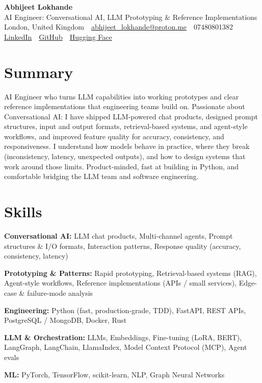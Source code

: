 \documentclass[10pt,a4paper]{article}
\newcommand{\sep}{\,\textcolor{accent!60}{\textbar}\,}
\begin{document}
\begin{center}
  {\fontsize{24}{26}\selectfont\bfseries Abhijeet Lokhande}\\[3pt]
  {\color{accent}\large AI Engineer: Conversational AI, LLM Prototyping \& Reference Implementations}\\[5pt]
  {\small
    London, United Kingdom \sep
    \href{mailto:abhijeet_lokhande@proton.me}{abhijeet\_lokhande@proton.me} \sep
    07480801382 \\[2pt]
    \href{https://www.linkedin.com/in/ablds/}{LinkedIn} \sep
    \href{https://github.com/abhijeetscode}{GitHub} \sep
    \href{https://huggingface.co/ab-ai}{Hugging Face}
  }
\end{center}
\vspace{2pt}

\section{Summary}
AI Engineer who turns LLM capabilities into working prototypes and clear reference implementations that engineering teams build on. Passionate about Conversational AI: I have shipped LLM-powered chat products, designed prompt structures, input and output formats, retrieval-based systems, and agent-style workflows, and improved feature quality for accuracy, consistency, and responsiveness. I understand how models behave in practice, where they break (inconsistency, latency, unexpected outputs), and how to design systems that work around those limits. Product-minded, fast at building in Python, and comfortable bridging the LLM team and software engineering.

\section{Skills}
\begin{tight}
  \item[\textcolor{accent}{\small$\bullet$}] \textbf{Conversational AI:} LLM chat products, Multi-channel agents, Prompt structures \& I/O formats, Interaction patterns, Response quality (accuracy, consistency, latency)
  \item[\textcolor{accent}{\small$\bullet$}] \textbf{Prototyping \& Patterns:} Rapid prototyping, Retrieval-based systems (RAG), Agent-style workflows, Reference implementations (APIs / small services), Edge-case \& failure-mode analysis
  \item[\textcolor{accent}{\small$\bullet$}] \textbf{Engineering:} Python (fast, production-grade, TDD), FastAPI, REST APIs, PostgreSQL / MongoDB, Docker, Rust
  \item[\textcolor{accent}{\small$\bullet$}] \textbf{LLM \& Orchestration:} LLMs, Embeddings, Fine-tuning (LoRA, BERT), LangGraph, LangChain, LlamaIndex, Model Context Protocol (MCP), Agent evals
  \item[\textcolor{accent}{\small$\bullet$}] \textbf{ML:} PyTorch, TensorFlow, scikit-learn, NLP, Graph Neural Networks
\end{tight}
\end{document}
